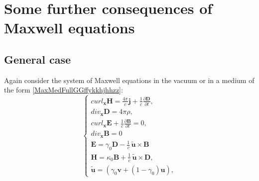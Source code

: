\documentclass{article}
\theoremstyle{definition}
\theoremstyle{remark}
\renewcommand{\vec}[1]{\mathbf{#1}}
\newcommand{\R}{\mathbb{R}}
\newcommand{\er}{\eqref}
\newcommand{\R}{{\mathbb{R}}}
\newcommand{\er}{\eqref}
\begin{document}
\section{Some further consequences of Maxwell equations}\label{CM}
\subsection{General case}\label{gcCM}
Again consider the system of Maxwell equations in the vacuum or in a
medium of the form \er{MaxMedFullGGffykkhjhhzz}:
\begin{equation}\label{MaxVacFullPPNffGG}
\begin{cases}
curl_{\vec x} \vec H=\frac{4\pi}{c}\vec j+
\frac{1}{c}\frac{\partial \vec D}{\partial t},\\
div_{\vec x} \vec D=4\pi\rho,\\
curl_{\vec x} \vec E+\frac{1}{c}\frac{\partial \vec B}{\partial t}=0,\\
div_{\vec x} \vec B=0\\
\vec E=\gamma_0\vec D-\frac{1}{c}\,\vec {\tilde u}\times \vec B\\
\vec H=\kappa_0\vec B+\frac{1}{c}\,\vec {\tilde u}\times \vec D,\\
\vec {\tilde u}=\left(\gamma_0\vec v+(1-\gamma_0)\vec u\right),
\end{cases}
\end{equation}
%
%
%
\begin{comment}
\begin{equation}\label{MaxVacFullPPNffGG}
\begin{cases}
curl_{\vec x} \vec H\equiv \frac{4\pi}{c}\vec
j+\frac{1}{c}\frac{\partial
\vec D}{\partial t},\\
div_{\vec x} \vec D\equiv 4\pi\rho,\\
curl_{\vec x} \vec E+\frac{1}{c}\frac{\partial \vec B}{\partial t}\equiv 0,\\
div_{\vec x} \vec B\equiv 0,\\
\vec E=\vec D-\frac{1}{c}\,\vec v\times \vec B,\\
\vec H=\vec B+\frac{1}{c}\,\vec v\times \vec D,
\end{cases}
\end{equation}
\end{comment}
\end{document}
